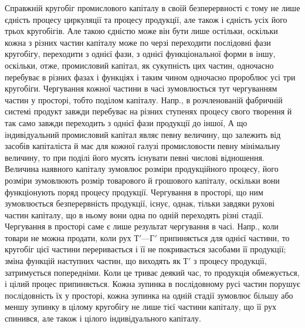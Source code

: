 Справжній кругобіг промислового капіталу в своїй безперервності
є тому не лише єдність процесу циркуляції та процесу продукції, але
також і єдність усіх його трьох кругобігів. Але такою єдністю може він
бути лише остільки, оскільки кожна з різних частин капіталу може по
черзі переходити послідовні фази кругобігу, переходити з однієї фази,
з однієї функціональної форми в іншу, оскільки, отже, промисловий капітал,
як сукупність цих частин, одночасно перебуває в різних фазах
і функціях і таким чином одночасно пророблює усі три кругобіги. Чергування
кожної частини в часі зумовлюється тут чергуванням частин у
просторі, тобто поділом капіталу. Напр., в розчленованій фабричній
системі продукт завжди перебуває на різних ступенях процесу свого
творення й так само завжди переходить з однієї фази продукції до іншої,
А що індивідуальний промисловий капітал являє певну величину, що
залежить від засобів капіталіста й має для кожної галузі промисловости
певну мінімальну величину, то при поділі його мусять існувати певні числові
відношення. Величина наявного капіталу зумовлює розміри продукційного
процесу, його розміри зумовлюють розмір товарового й грошового
капіталу, оскільки вони функціонують поряд процесу продукції. Чергування
в просторі, що ним зумовлюється безперервність продукції, існує, однак,
тільки завдяки рухові частин капіталу, що в ньому вони одна по одній переходять
різні стадії. Чергування в просторі саме є лише результат чергування
в часі. Напр., коли товари не можна продати, коли рух $Т' — Г'$
припиняється для однієї частини, то кругобіг цієї частини переривається
і її не покривається засобами її продукції; зміна функцій наступних
частин, що виходять як $Т'$ з процесу продукції, затримується
попередніми. Коли це триває деякий час, то продукція обмежується, і
цілий процес припиняється. Кожна зупинка в послідовному русі частин
порушує послідовність їх у просторі, кожна зупинка на одній стадії
зумовлює більшу або меншу зупинку в цілому кругобігу не лише тієї
частини капіталу, що її рух спинився, але також і цілого індивідуального
капіталу.

